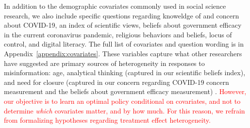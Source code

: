 \documentclass[letterpaper, 12pt, parskip=full,]{scrartcl}
\begin{document}
In addition to the demographic covariates commonly used in social science research, we also include specific questions regarding knoweldge of and concern about COVID-19, an index of scientific views, beliefs about government efficacy in the current coronavirus pandemic, religious behaviors and beliefs, locus of control, and digital literacy. The full list of covariates and question wording is in Appendix~\ref{appendix:covariates}. These variables capture what other researchers have suggested are primary sources of heterogeneity in responses to misinformation: age, analytical thinking (captured in our scientific beliefs index), and need for closure (captured in our concern regarding COVID-19 concern measurement and the beliefs about government efficacy measurement) \citep{wittenberg2020misinformation}. \textcolor{red}{However, our objective is to learn an optimal policy conditional on covariates, and not to determine \textit{which} covariates matter, and by how much. For this reason, we refrain from formalizing hypotheses regarding treatment effect heterogeneity.}




\end{document}
